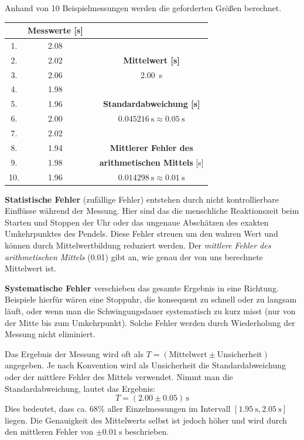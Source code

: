 \documentclass[ngerman]{scrreprt}
\newenvironment{loesungbox}[1]
  {\needspace{5\baselineskip}\begin{loesungboxstyle}[frametitle={#1}]}
  {\end{loesungboxstyle}}
\begin{document}
\begin{loesungbox}{Lösung zu \Cref{aufg:stat_fehler}}
Anhand von 10 Beispielmessungen werden die geforderten Größen berechnet.
\begin{center}
\begin{tabular}{c|c|c|c}
\toprule
 & \textbf{Messwerte} [\si{\second}] && \\
\hline
1. & \num{2.08} & & \\
2. & \num{2.02} & & \textbf{Mittelwert [\si{\second}]}\\
3. & \num{2.06} & &  \SI{2.00}{\second} \\
4. & \num{1.98} & &  \\
5. & \num{1.96} & & \textbf{Standardabweichung [\si{\second}]} \\
6. & \num{2.00} & & $\SI{0.045216}{\second} \approx \SI{0.05}{\second}$ \\
7. & \num{2.02} & & \\
8. & \num{1.94} & & \textbf{Mittlerer Fehler des}\\
9. & \num{1.98} & & \textbf{arithmetischen Mittels} [\si{\second}]\\
10. & \num{1.96} & & $\SI{0.014298}{\second} \approx \SI{0.01}{\second}$ \\
\bottomrule
\end{tabular}
\end{center}
\textbf{Statistische Fehler} (zufällige Fehler) entstehen durch nicht kontrollierbare Einflüsse während der Messung. Hier sind das \zB die menschliche Reaktionszeit beim Starten und Stoppen der Uhr oder das ungenaue Abschätzen des exakten Umkehrpunktes des Pendels. Diese Fehler streuen um den wahren Wert und können durch Mittelwertbildung reduziert werden. Der \textit{mittlere Fehler des arithmetischen Mittels} (\num{0.01}) gibt an, wie genau der von uns berechnete Mittelwert ist.

\textbf{Systematische Fehler} verschieben das gesamte Ergebnis in eine Richtung. Beispiele hierfür wären eine Stoppuhr, die konsequent zu schnell oder zu langsam läuft, oder wenn man die Schwingungsdauer systematisch zu kurz misst (\zB nur von der Mitte bis zum Umkehrpunkt). Solche Fehler werden durch Wiederholung der Messung nicht eliminiert.

Das Ergebnis der Messung wird oft als $T = (\text{Mittelwert} \pm \text{Unsicherheit})$ angegeben. Je nach Konvention wird als Unsicherheit die Standardabweichung oder der mittlere Fehler des Mittels verwendet. Nimmt man die Standardabweichung, lautet das Ergebnis:
\begin{equation}
    T = (\num{2.00} \pm \num{0.05})\,\si{\second}
\end{equation}
Dies bedeutet, dass ca. 68\% aller Einzelmessungen im Intervall $[\SI{1.95}{\second}, \SI{2.05}{\second}]$ liegen. Die Genauigkeit des Mittelwerts selbst ist jedoch höher und wird durch den mittleren Fehler von $\pm\SI{0.01}{\second}$ beschrieben.
\end{loesungbox}
\end{document}
